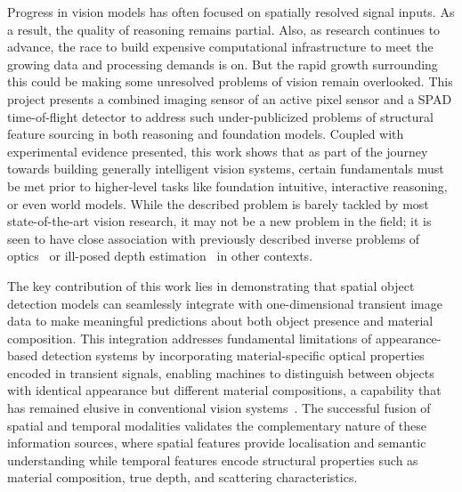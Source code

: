 \documentclass[12pt,a4paper,oneside]{report}
\begin{document}
Progress in vision models has often focused on spatially resolved signal inputs. As a result, the quality of reasoning remains partial. Also, as research continues to advance, the race to build expensive computational infrastructure to meet the growing data and processing demands is on. But the rapid growth surrounding this could be making some unresolved problems of vision remain overlooked. This project presents a combined imaging sensor of an active pixel sensor and a SPAD time-of-flight detector to address such under-publicized problems of structural feature sourcing in both reasoning and foundation models. Coupled with experimental evidence presented, this work shows that as part of the journey towards building generally intelligent vision systems, certain fundamentals must be met prior to higher-level tasks like foundation intuitive, interactive reasoning, or even world models. While the described problem is barely tackled by most state-of-the-art vision research, it may not be a new problem in the field; it is seen to have close association with previously described inverse problems of optics~\cite{hart1973,koerner2021} or ill-posed depth estimation~\cite{depthpro2024} in other contexts.

The key contribution of this work lies in demonstrating that spatial object detection models can seamlessly integrate with one-dimensional transient image data to make meaningful predictions about both object presence and material composition. This integration addresses fundamental limitations of appearance-based detection systems by incorporating material-specific optical properties encoded in transient signals, enabling machines to distinguish between objects with identical appearance but different material compositions, a capability that has remained elusive in conventional vision systems~\cite{depthpro2024,gyongy2021,gadzicki2020}. The successful fusion of spatial and temporal modalities validates the complementary nature of these information sources, where spatial features provide localisation and semantic understanding while temporal features encode structural properties such as material composition, true depth, and scattering characteristics.
\end{document}
